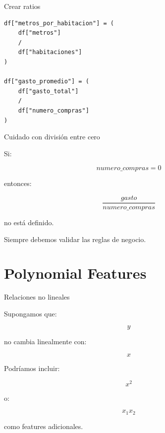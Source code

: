 \documentclass[aspectratio=169,11pt]{beamer}
\begin{document}

\begin{frame}[fragile]{Crear ratios}

\begin{lstlisting}
df["metros_por_habitacion"] = (
    df["metros"]
    /
    df["habitaciones"]
)

df["gasto_promedio"] = (
    df["gasto_total"]
    /
    df["numero_compras"]
)
\end{lstlisting}

\end{frame}


\begin{frame}{Cuidado con división entre cero}

Si:

\[
numero\_compras=0
\]

entonces:

\[
\frac{
gasto
}{
numero\_compras
}
\]

no está definido.

\vspace{0.4cm}

Siempre debemos validar las reglas de negocio.

\end{frame}

\section{Polynomial Features}

\begin{frame}{Relaciones no lineales}

Supongamos que:

\[
y
\]

no cambia linealmente con:

\[
x
\]

Podríamos incluir:

\[
x^2
\]

o:

\[
x_1x_2
\]

como features adicionales.

\end{frame}

\end{document}
